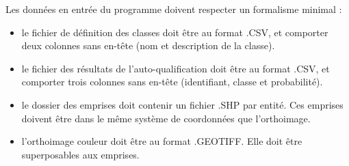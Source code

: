 \noindent Les données en entrée du programme doivent respecter un formalisme minimal :
\begin{itemize}[label=$\rightarrow$]
	\item le fichier de définition des classes doit être au format .CSV, et comporter deux colonnes sans en-tête (nom et description de la classe).
	\item le fichier des résultats de l'auto-qualification doit être au format .CSV, et comporter trois colonnes sans en-tête (identifiant, classe et probabilité).
	\item le dossier des emprises doit contenir un fichier .SHP par entité. Ces emprises doivent être dans le même système de coordonnées que l'orthoimage.
	\item l'orthoimage couleur doit être au format .GEOTIFF. Elle doit être superposables aux emprises.
\end{itemize}
